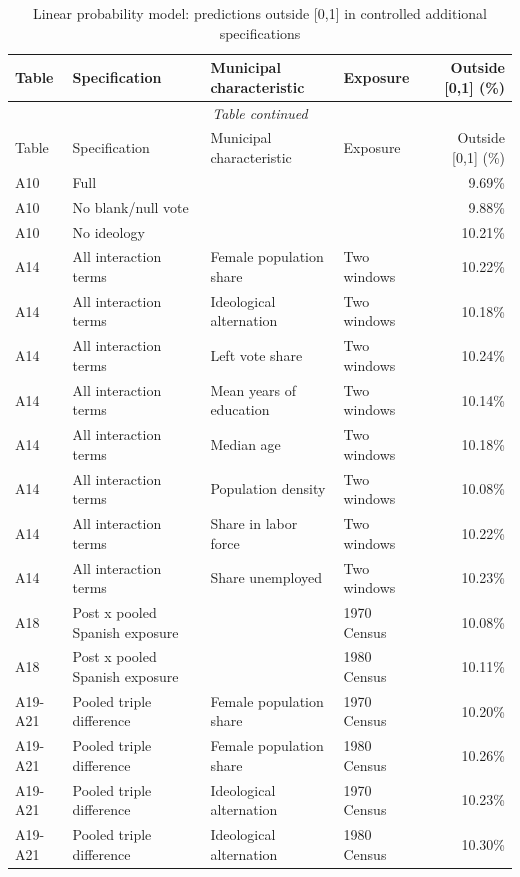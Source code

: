 \begin{longtable}{p{}p{}p{}p{}r}
\caption{Linear probability model: predictions outside [0,1] in controlled additional specifications}\label{tab:lpm_outside_remaining}\\
\hline
Table & Specification & Municipal characteristic & Exposure & Outside [0,1] (\%) \\
\hline
\endfirsthead
\multicolumn{5}{c}{\textit{Table continued}} \\
\hline
Table & Specification & Municipal characteristic & Exposure & Outside [0,1] (\%) \\
\hline
\endhead
A10 & Full &  &  &  9.69\% \\
A10 & No blank/null vote &  &  &  9.88\% \\
A10 & No ideology &  &  & 10.21\% \\
\addlinespace
A14 & All interaction terms & Female population share & Two windows & 10.22\% \\
A14 & All interaction terms & Ideological alternation & Two windows & 10.18\% \\
A14 & All interaction terms & Left vote share & Two windows & 10.24\% \\
A14 & All interaction terms & Mean years of education & Two windows & 10.14\% \\
A14 & All interaction terms & Median age & Two windows & 10.18\% \\
A14 & All interaction terms & Population density & Two windows & 10.08\% \\
A14 & All interaction terms & Share in labor force & Two windows & 10.22\% \\
A14 & All interaction terms & Share unemployed & Two windows & 10.23\% \\
\addlinespace
A18 & Post x pooled Spanish exposure &  & 1970 Census & 10.08\% \\
A18 & Post x pooled Spanish exposure &  & 1980 Census & 10.11\% \\
\addlinespace
A19-A21 & Pooled triple difference & Female population share & 1970 Census & 10.20\% \\
A19-A21 & Pooled triple difference & Female population share & 1980 Census & 10.26\% \\
A19-A21 & Pooled triple difference & Ideological alternation & 1970 Census & 10.23\% \\
A19-A21 & Pooled triple difference & Ideological alternation & 1980 Census & 10.30\% \\

\end{longtable}
